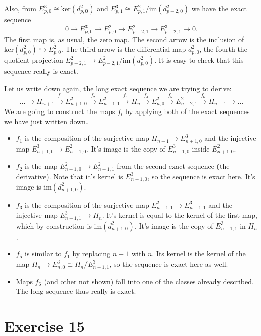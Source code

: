 \documentclass{article}
\begin{document}
Also, from $E^3_{p,0} \cong \mathrm{ker}(d^2_{p,0})$ and $E^3_{p,1} \cong E^2_{p,1}/\mathrm{im}(d^2_{p+2,0})$ we have the exact sequence
\begin{equation*}
0 \to E^3_{p,0} \to E^2_{p,0} \to E^2_{p-2,1} \to E^3_{p-2,1} \to 0.
\end{equation*}
The first map is, as usual, the zero map. The second arrow is the inclusion of $\mathrm{ker}(d^2_{p,0}) \hookrightarrow E^2_{p,0}$. The third arrow is the differential map $d^2_{p,0}$, the fourth the quotient projection $E^2_{p-2,1} \to E^2_{p-2,1}/\mathrm{im}(d^2_{p,0})$. It is easy to check that this sequence really is exact.

Let us write down again, the long exact sequence we are trying to derive:
\begin{equation*}
\dots \to H_{n+1} \xrightarrow{f_1} E^2_{n+1,0} \xrightarrow{f_2}  E^2_{n-1,1} \xrightarrow{f_3}  H_n \xrightarrow{f_4}  E^2_{n,0} \xrightarrow{f_5}  E^2_{n-2,1} \xrightarrow{f_6}  H_{n-1} \to \dots
\end{equation*}
We are going to construct the maps $f_i$ by applying both of the exact sequences we have just written down.
\begin{itemize}
\item $f_1$ is the composition of the surjective map $H_{n+1} \to E_{n+1,0}^3$ and the injective map $E^3_{n+1,0} \to E^2_{n+1,0}$. It's image is the copy of $E^3_{n+1,0}$ inside $E^2_{n+1,0}$.
\item $f_2$ is the map $E^2_{n+1,0} \to E^2_{n-1,1}$ from the second exact sequence (the derivative). Note that it's kernel is $E^3_{n+1,0}$, so the sequence is exact here. It's image is $\mathrm{im}(d^2_{n+1,0})$.
\item $f_3$ is the composition of the surjective map $E^2_{n-1,1} \to E^3_{n-1,1}$ and the injective map $E^3_{n-1,1} \to H_n$. It's kernel is equal to the kernel of the first map, which by construction is $\mathrm{im}(d^2_{n+1,0})$. It's image is the copy of $E^3_{n-1,1}$ in $H_n$.
\item $f_5$ is similar to $f_1$ by replacing $n+1$ with $n$. Its kernel is the kernel of the map $H_n \to E_{n,0}^3 \cong H_n/E^3_{n-1,1}$, so the sequence is exact here as well.
\item Maps $f_6$ (and other not shown) fall into one of the classes already described. The long sequence thus really is exact. 
\end{itemize}
\section*{Exercise 15}
\end{document}
